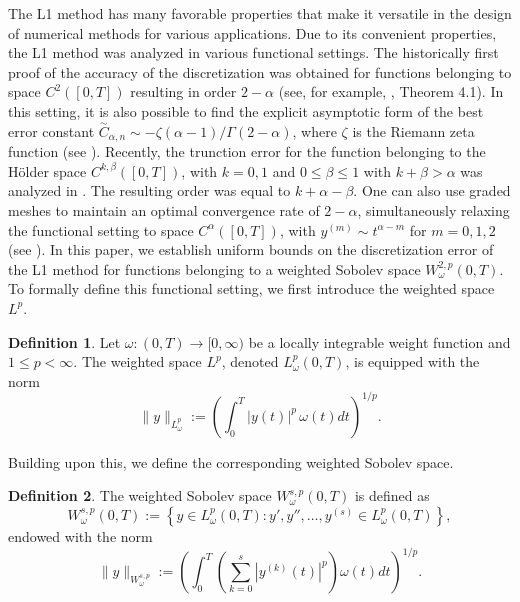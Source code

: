 \documentclass[12pt,a4paper]{article}
\theoremstyle{definition}
\newtheorem{definition}{Definition}
\begin{document}
The L1 method has many favorable properties that make it versatile in the design of numerical methods for various applications. Due to its convenient properties, the L1 method was analyzed in various functional settings. The historically first proof of the accuracy of the discretization was obtained for functions belonging to space $C^2([0,T])$ resulting in order $2-\alpha$ (see, for example, \cite{LiCai2019}, Theorem 4.1). In this setting, it is also possible to find the explicit asymptotic form of the best error constant $\overset{\sim}{C}_{\alpha,n}\sim-\zeta(\alpha-1)/\Gamma(2-\alpha)$, where $\zeta$ is the Riemann zeta function (see \cite{Plociniczak2023}). Recently, the trunction error for the function belonging to the H\"older space $C^{k, \beta}([0,T])$, with $k=0,1$ and $0\le\beta\le1$ with $k+\beta>\alpha$ was analyzed in \cite{delTesoPłociniczak2025}. The resulting order was equal to $k+\alpha-\beta$. One can also use graded meshes to maintain an optimal convergence rate of $2-\alpha$, simultaneously relaxing the functional setting to space $C^{\alpha}([0,T])$, with $y^{(m)}\sim t^{\alpha-m}$ for $m=0,1,2$ (see \cite{Stynesetal2017, Kopteva2019}). In this paper, we establish uniform bounds on the discretization error of the L1 method for functions belonging to a weighted Sobolev space $W^{2,p}_\omega(0,T)$. To formally define this functional setting, we first introduce the weighted space $L^p$.
\begin{definition}
    Let $\omega: (0,T) \to [0, \infty)$ be a locally integrable weight function and $1 \leq p < \infty$. The weighted space $L^p$, denoted $L^p_\omega(0,T)$, is equipped with the norm
\begin{equation}
    \|y\|_{L^p_\omega} := \left( \int_0^T |y(t)|^p \, \omega(t) dt \right)^{1/p}.
\end{equation}
\end{definition}
Building upon this, we define the corresponding weighted Sobolev space.
\begin{definition}
The weighted Sobolev space $W^{s,p}_\omega(0,T)$ is defined as
\begin{equation}
    W^{s,p}_\omega(0,T) := \left\{ y \in L^p_\omega(0,T) : y', y'', \ldots, y^{(s)} \in L^p_\omega(0,T) \right\},
\end{equation}
endowed with the norm
\begin{equation} \label{eq:W1p_norm}
    \|y\|_{W^{s,p}_\omega} := \left( \int_0^T \left( \sum_{k=0}^s|y^{(k)}(t)|^p \right) \omega(t) dt \right)^{1/p}.
\end{equation}
\end{definition}
\end{document}
